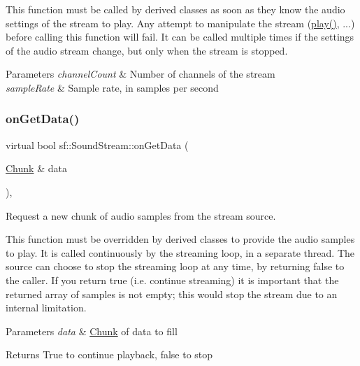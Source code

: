 This function must be called by derived classes as soon as they know the audio settings of the stream to play. Any attempt to manipulate the stream (\hyperlink{classsf_1_1_sound_stream_afdc08b69cab5f243d9324940a85a1144}{play()}, ...) before calling this function will fail. It can be called multiple times if the settings of the audio stream change, but only when the stream is stopped.


\begin{DoxyParams}{Parameters}
{\em channel\+Count} & Number of channels of the stream \\
\hline
{\em sample\+Rate} & Sample rate, in samples per second \\
\hline
\end{DoxyParams}
\mbox{\label{classsf_1_1_sound_stream_a968ec024a6e45490962c8a1121cb7c5f}} 
\subsubsection{\texorpdfstring{on\+Get\+Data()}{onGetData()}}
{\footnotesize\ttfamily virtual bool sf\+::\+Sound\+Stream\+::on\+Get\+Data (\begin{DoxyParamCaption}\item[{\hyperlink{structsf_1_1_sound_stream_1_1_chunk}{Chunk} \&}]{data }\end{DoxyParamCaption})\hspace{0.3cm}{\ttfamily [protected]}, {}}



Request a new chunk of audio samples from the stream source. 

This function must be overridden by derived classes to provide the audio samples to play. It is called continuously by the streaming loop, in a separate thread. The source can choose to stop the streaming loop at any time, by returning false to the caller. If you return true (i.\+e. continue streaming) it is important that the returned array of samples is not empty; this would stop the stream due to an internal limitation.


\begin{DoxyParams}{Parameters}
{\em data} & \hyperlink{structsf_1_1_sound_stream_1_1_chunk}{Chunk} of data to fill\\
\hline
\end{DoxyParams}
\begin{DoxyReturn}{Returns}
True to continue playback, false to stop 
\end{DoxyReturn}


